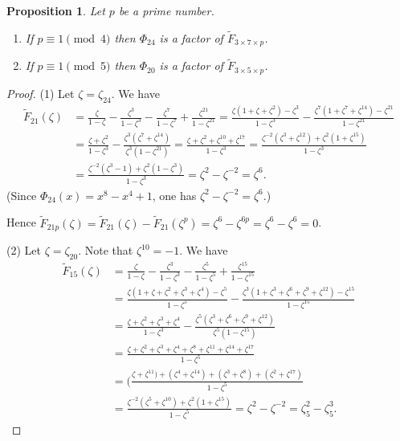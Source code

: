 \documentclass[12t,a4paper]{amsart}
\newtheorem{prop}[thm]{Proposition}
\theoremstyle{definition}
\numberwithin{equation}{section}
\begin{document}
{\begin{prop} \label{prop:example-new-factors}
Let $p$ be a prime number.
\begin{enumerate}
\item  If $p\equiv 1\pmod 4$  then $\Phi_{24}$ is a factor of  $\widetilde{F}_{3\times 7\times p}$.
\item If $p\equiv 1\pmod {5}$  then $\Phi_{20}$ is a factor of $\widetilde{F}_{3\times 5\times p}$.
\end{enumerate}
\end{prop}
\begin{proof} (1) Let $\zeta=\zeta_{24}$. We have
\[
\begin{aligned}
\tilde{F}_{21}(\zeta)&=\frac{\zeta}{1-\zeta} -\frac{\zeta^3}{1-\zeta^3}-\frac{\zeta^7}{1-\zeta^7}+\frac{\zeta^{21}}{1-\zeta^{21}}
=\frac{\zeta(1+\zeta+\zeta^2)-\zeta^3}{1-\zeta^3} -\frac{\zeta^7(1+\zeta^7+\zeta^{14})-\zeta^{21}}{1-\zeta^{21}}\\
&=\frac{\zeta+\zeta^2}{1-\zeta^3} - \frac{\zeta^3(\zeta^7+\zeta^{14})}{\zeta^3(1-\zeta^{21})}
=\frac{\zeta+\zeta^2+\zeta^{10}+\zeta^{17}}{1-\zeta^3} 
=\frac{\zeta^{-2}(\zeta^3+\zeta^{12})+\zeta^2(1+\zeta^{15})}{1-\zeta^3}\\
&=\frac{\zeta^{-2}(\zeta^3-1)+\zeta^2(1-\zeta^{3})}{1-\zeta^3}=\zeta^2-\zeta^{-2}=\zeta^6.
\end{aligned}
\]
(Since $\Phi_{24}(x)=x^8-x^4+1$, one has $\zeta^2-\zeta^{-2}=\zeta^6$.)

Hence $\tilde{F}_{21p}(\zeta)=\tilde{F}_{21}(\zeta)-\tilde{F}_{21}(\zeta^p)=\zeta^6-\zeta^{6p}=\zeta^6-\zeta^6=0$.


(2) Let $\zeta=\zeta_{20}$. Note that $\zeta^{10}=-1$. We have
\[
\begin{aligned}
\tilde{F}_{15}(\zeta)&=\frac{\zeta}{1-\zeta} -\frac{\zeta^3}{1-\zeta^3}-\frac{\zeta^5}{1-\zeta^5}+\frac{\zeta^{15}}{1-\zeta^{15}}\\
&=\frac{\zeta(1+\zeta+\zeta^2+\zeta^3+\zeta^4)-\zeta^5}{1-\zeta^5} -\frac{\zeta^3(1+\zeta^3+\zeta^{6}+\zeta^9+\zeta^{12})-\zeta^{15}}{1-\zeta^{15}}\\
&=\frac{\zeta+\zeta^2+\zeta^3+\zeta^4}{1-\zeta^3} - \frac{\zeta^5(\zeta^3+\zeta^6+\zeta^9+\zeta^{12})}{\zeta^5(1-\zeta^{15})}\\
&=\frac{\zeta+\zeta^2+\zeta^3+\zeta^4+\zeta^8+\zeta^{11}+\zeta^{14}+\zeta^{17}}{1-\zeta^5}\\
&=(\frac{\zeta+\zeta^{11})+(\zeta^4+\zeta^{14})+( \zeta^3+ \zeta^8)+(\zeta^2+ \zeta^{17})}{1-\zeta^5}\\
&=\frac{\zeta^{-2}(\zeta^5+\zeta^{10})+\zeta^2(1+\zeta^{15})}{1-\zeta^{5}}=\zeta^2-\zeta^{-2} = \zeta_5^2 - \zeta_5^3.
\end{aligned}
 \]


\end{proof}}
\end{document}
